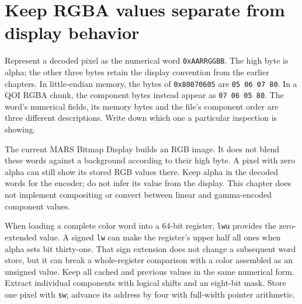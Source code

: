 \section{Keep RGBA values separate from display behavior}
Represent a decoded pixel as the numerical word \texttt{0xAARRGGBB}. The high byte is
alpha; the other three bytes retain the display convention from the earlier chapters.
In little-endian memory, the bytes of \texttt{0x80070605} are \texttt{05 06 07 80}.
In a QOI RGBA chunk, the component bytes instead appear as \texttt{07 06 05 80}.
The word's numerical fields, its memory bytes and the file's component order are three
different descriptions. Write down which one a particular inspection is showing.

The current MARS Bitmap Display builds an RGB image. It does not blend these words
against a background according to their high byte. A pixel with zero alpha can still
show its stored RGB values there. Keep alpha in the decoded words for the encoder;
do not infer its value from the display. This chapter does not implement compositing
or convert between linear and gamma-encoded component values.

When loading a complete color word into a 64-bit register, \texttt{lwu} provides the
zero-extended value. A signed \texttt{lw} can make the register's upper half all ones
when alpha sets bit thirty-one. That sign extension does not change a subsequent
word store, but it can break a whole-register comparison with a color assembled as
an unsigned value. Keep all cached and previous values in the same numerical form.
Extract individual components with logical shifts and an eight-bit mask. Store one
pixel with \texttt{sw}; advance its address by four with full-width pointer arithmetic.
